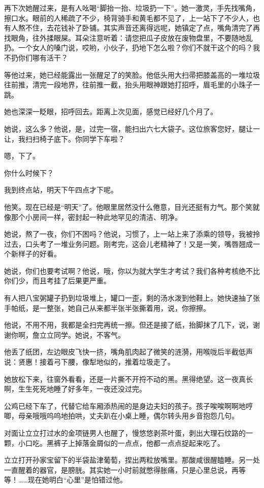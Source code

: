 \documentclass[lang=cn,newtx,12pt,scheme=chinese]{elegantbook}
\begin{document}
再下次她醒过来，是有人吆喝“脚抬一抬、垃圾扔一下”。她一激灵，手先找嘴角，擦口水。眼前的人稀疏了不少，椅背骑手和黄毛都不见了，上一站下了不少人，也有人熬不住，去花钱补了卧铺。其实声音还离得远呢，她镇定了点，嘴角清完了再找眼角，往外揉眼屎。耳朵注意听着：请您把瓜子皮放在废物盘里，不要随地乱扔。一个女人的嗓门说，哎哟，小伙子，扔地下怎么啦？你们不就干这个的吗？我不扔你们哪有活干？

等他过来，她已经能露出一张醒足了的笑脸。他低头用大扫帚把膝盖高的一堆垃圾往前推，清完一段地界，往前推一截，抬头用眼神跟她打招呼，眉毛里的小珠子一跳。

她也深深一眨眼，招呼回去。距离上次见面，感觉已经好几个月了。

她说，这么多？他说，是，过完一宿，能扫出六七大袋子。这位旅客您好，腿让一让，我扫扫椅子底下。你同学下车啦？

嗯，下了。

你什么时候下？

我到终点站，明天下午四点才下呢。

他笑。现在已经是“明天”了。他眼里居然没什么倦意，目光还挺有力气。那个笑就像那个小房间一样，密封起一种此地罕见的清洁、明净。

她说，熬了一夜，你们不困吗？他说，习惯了，上一站上来了添乘的领导，我被拎过去，口头考了一堆业务问题。刚考完，这会儿老精神了！又是一笑，嘴唇翘成一个新样子的好看。

她说，你们也要考试啊？他说，哦，你以为就大学生才考试？我们各种考核绝不比你们少，而且考挂了后果更严重。

有人把八宝粥罐子扔到垃圾堆上，罐口一歪，剩的汤水泼到他鞋上。她快速抽了张手帕纸，是一整张，她自己从来都半张半张撕着用，说，你擦擦。

他说，不用不用，我都是全扫完再统一擦。但还是接了纸，抬脚抹了几下，说，谢谢你啊，詹立立同学。她说，不客气。

他丢了纸团，左边眼皮飞快一挤，嘴角肌肉起了微笑的涟漪，用喉咙后半截低声说：贤惠！接着弓下腰，像犁地似的，推着垃圾走了。

她放松下来，往窗外看看，还是一片撕不开捋不动的黑。黑得绝望。这一夜真长啊，生生死死地睡了好多年，一夜还没过完。

公鸡已经下车了，代替它给车厢添热闹的是身边夫妇的孩子。孩子唉唉啊啊地哼唧，母亲哦哦呜呜地拍哄，丈夫趴在小桌上睡，偶尔转头用乡音抱怨几句。

对面让立立打过水的金项链男人也醒了，慢悠悠剥茶叶蛋，剥出大理石纹路的一颗，小口吃。黑裤子上掉落金屑似的一点点，他都一点点捉起来吃了。

立立打开孙家宝留下的半袋盐津葡萄，捏出两粒放嘴里。那酸咸很醒瞌睡。另一处一直醒着的器官，是膀胱。其实她一小时前就憋得胀痛，只是心里总说，再等等！……现在她明白“心里”是怕错过他。
\end{document}
